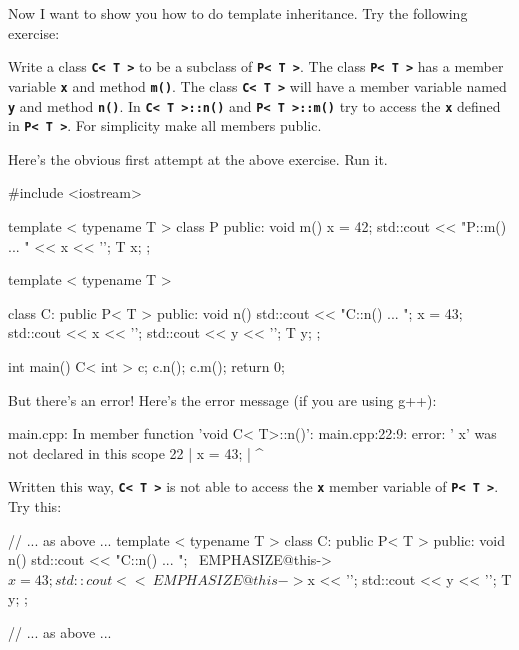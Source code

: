 Now I want to show you how to do template inheritance. Try the following
exercise:

\begin{ex}
Write a class \texttt{\textbf{C< T >}} to be a subclass of \texttt{\textbf{P< T >}}. The class \texttt{\textbf{P< T >}} has a member variable \texttt{\textbf{x}} and method \texttt{\textbf{m()}}. The class \texttt{\textbf{C< T >}}\textbf{ }will have a member variable named \texttt{\textbf{y}} and method \texttt{\textbf{n()}}. In \texttt{\textbf{C< T >::n()}} and \texttt{\textbf{P< T >::m()}} try to access the \texttt{\textbf{x}} defined in \texttt{\textbf{P< T >}}. For simplicity make all members public.
\end{ex}
Here's the obvious first attempt at the above exercise. Run it.
\begin{console}
#include <iostream>

template < typename T >
class P
{
public:
        void m()
        {
              x = 42;
              std::cout << "P::m() ... " << x << '\n';
        }
        T x;
};

template < typename T >

class C: public P< T >
{
public:
        void n()
        {
             std::cout << "C::n() ... \n";
             x = 43;
             std::cout << x << '\n';
             std::cout << y << '\n';
        }
        T y;
};

int main()
{   
    C< int > c;
    c.n();
    c.m();
    return 0;
}
\end{console}

But there's an error! Here's the error message (if you are using g++):
\begin{console}
main.cpp: In member function 'void C< T>::n()':
main.cpp:22:9: error: ' x'{} was not declared in this
scope
22 |         x = 43;
   |         ^ 
\end{console}

Written this way, \texttt{\textbf{C< T >}} is not able to access the \texttt{\textbf{x}} member variable of \texttt{\textbf{P< T >}}. Try this:
\begin{console}[commandchars=\~\@\$]
// ... as above ...
template < typename T >
class C: public P< T >
{
public:
        void n()
        {
             std::cout << "C::n() ... \n";
             ~EMPHASIZE@this->$x = 43;
             std::cout << ~EMPHASIZE@this->$x << '\n';
             std::cout << y << '\n';
        }
        T y;
};

// ... as above ...
\end{console}
